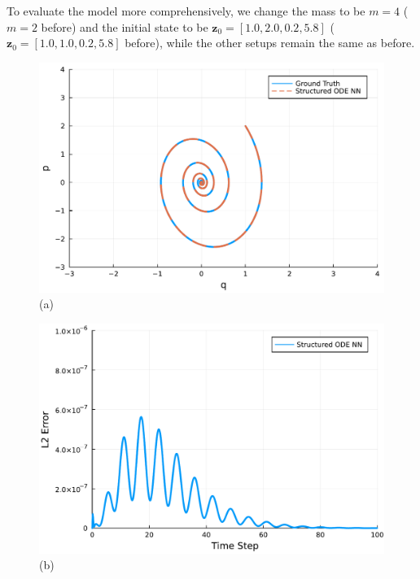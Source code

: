 \documentclass[
	parskip, 			   %
	twoside, 			   %
	DIV=14, 			   %
	BCOR=15.0mm, 		   %
	headsepline, 		   %
	open=right, 		   %
	captions=tableheading, %
	bibliography=totoc,    %
	numbers=noenddot       %
]{scrreprt}
\begin{document}
To evaluate the model more comprehensively, we change the mass to be $m=4$ ($m=2$ before) and the initial state to be $\mathbf{z}_{0} = [1.0, 2.0, 0.2, 5.8]$ ($\mathbf{z}_{0} = [1.0, 1.0, 0.2, 5.8]$ before), while the other setups remain the same as before.

\begin{figure}[h!]
    \centering
    \begin{minipage}{.3\textwidth}
    \centering
    \includegraphics[width=1\linewidth]{figures/phase_portrait_compositional_ndho_with_EPHS_structure_reuse.pdf}
    \\(a)
    \end{minipage}%
    \begin{minipage}{.3\textwidth}
    \centering
    \includegraphics[width=1\linewidth]{figures/prediction_error_compositional_ndho_with_EPHS_structure_reuse.pdf}
    \\(b)

\end{minipage}
\end{figure}
\end{document}
